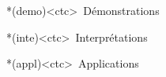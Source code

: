 \documentclass[../../main/main.tex]{subfiles}
\begin{document}
\begin{tcn}
	\begin{tcn}*(demo)<ctc>{\icondemo~Démonstrations}
	\end{tcn}
	\begin{tcn}*(inte)<ctc>{\iconinte~Interprétations}
	\end{tcn}
	\begin{tcn}*(appl)<ctc>{\iconappl~Applications}
	\end{tcn}

\end{tcn}
\end{document}

